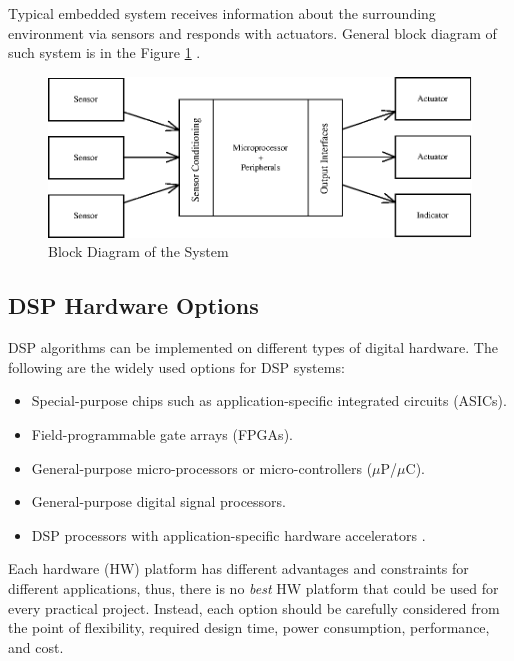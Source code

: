 \documentclass[twoside]{ctuthesis}
\theoremstyle{plain}
\theoremstyle{definition}
\theoremstyle{note}
\begin{document}
Typical embedded system receives information about the surrounding environment via sensors and responds with actuators. General block diagram of such system is in the Figure \ref{fig:generalEmbedded} \cite{cite:SE_for_ES}.                                                                    

\begin{figure}[h]
	\centering
	\includegraphics[width=1.0\textwidth]{generalEmbedded.eps}
	\caption{Block Diagram of the System \cite{cite:SE_for_ES}}
	\label{fig:generalEmbedded}
\end{figure}

\subsection{DSP Hardware Options}
DSP algorithms can be implemented on different types of digital hardware. The following are the widely used options for DSP systems:
\begin{itemize}
	\setlength{\itemsep}{5pt}
	\item Special-purpose chips such as application-specific integrated circuits (ASICs).
	\item Field-programmable gate arrays (FPGAs).
	\item General-purpose micro-processors or micro-controllers ($\mu$P/$\mu$C).
	\item General-purpose digital signal processors.
	\item DSP processors with application-specific hardware accelerators \cite{cite:RT_DSP}.
\end{itemize}

Each hardware (HW) platform has different advantages and constraints for different applications, thus, there is no \textit{best} HW platform that could be used for every practical project. Instead, each option should be carefully considered from the point of flexibility, required design time, power consumption, performance, and cost. 
\end{document}
